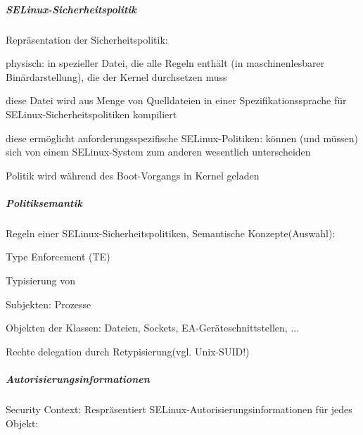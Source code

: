 \documentclass[a4paper]{article}
\begin{document}
\begin{multicols}{3}



    \subparagraph{SELinux-Sicherheitspolitik}

    Repräsentation der Sicherheitspolitik:

    \begin{itemize*}
        \item
        physisch: in spezieller Datei, die alle Regeln enthält (in
        maschinenlesbarer Binärdarstellung), die der Kernel durchsetzen muss
        \item
        diese Datei wird aus Menge von Quelldateien in einer
        Spezifikationssprache für SELinux-Sicherheitspolitiken kompiliert
        \item
        diese ermöglicht anforderungsspezifische SELinux-Politiken: können
        (und müssen) sich von einem SELinux-System zum anderen wesentlich
        unterscheiden
        \item
        Politik wird während des Boot-Vorgangs in Kernel geladen
    \end{itemize*}


    \subparagraph{Politiksemantik}

    Regeln einer SELinux-Sicherheitspolitiken, Semantische
    Konzepte(Auswahl):

    \begin{itemize*}
        \item
        Type Enforcement (TE)
        \item
        Typisierung von
        \begin{itemize*}
            \item Subjekten: Prozesse
            \item Objekten der Klassen: Dateien, Sockets, EA-Geräteschnittstellen, ...
        \end{itemize*}
        \item
        Rechte delegation durch Retypisierung(vgl. Unix-SUID!)
        \item
    \end{itemize*}


    \subparagraph{Autorisierungsinformationen}

    Security Context: Respräsentiert SELinux-Autorisierungsinformationen für
    jedes Objekt:


\end{multicols}
\end{document}
